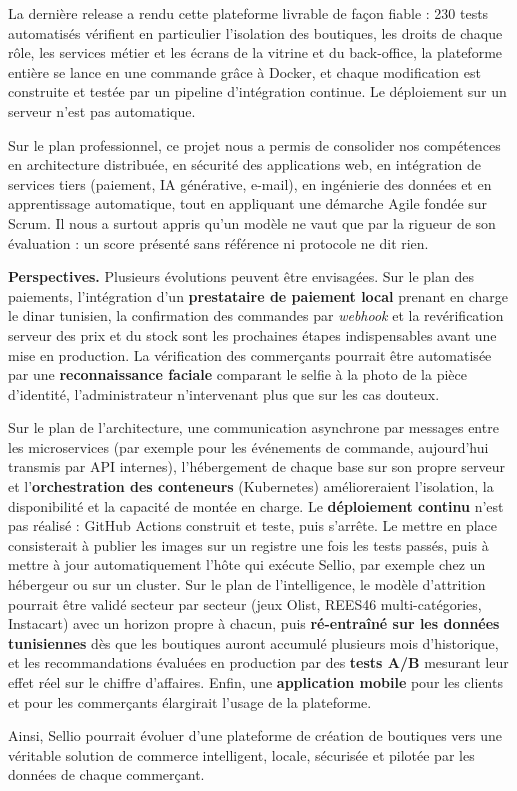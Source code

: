 La dernière release a rendu cette plateforme livrable de façon fiable : 230 tests automatisés vérifient en particulier l'isolation des boutiques, les droits de chaque rôle, les services métier et les écrans de la vitrine et du back-office, la plateforme entière se lance en une commande grâce à Docker, et chaque modification est construite et testée par un pipeline d'intégration continue. Le déploiement sur un serveur n'est pas automatique.\newline

Sur le plan professionnel, ce projet nous a permis de consolider nos compétences en architecture distribuée, en sécurité des applications web, en intégration de services tiers (paiement, IA générative, e-mail), en ingénierie des données et en apprentissage automatique, tout en appliquant une démarche Agile fondée sur Scrum. Il nous a surtout appris qu'un modèle ne vaut que par la rigueur de son évaluation : un score présenté sans référence ni protocole ne dit rien.\newline

\textbf{Perspectives.} Plusieurs évolutions peuvent être envisagées. Sur le plan des paiements, l'intégration d'un \textbf{prestataire de paiement local} prenant en charge le dinar tunisien, la confirmation des commandes par \textit{webhook} et la revérification serveur des prix et du stock sont les prochaines étapes indispensables avant une mise en production. La vérification des commerçants pourrait être automatisée par une \textbf{reconnaissance faciale} comparant le selfie à la photo de la pièce d'identité, l'administrateur n'intervenant plus que sur les cas douteux.

Sur le plan de l'architecture, une communication asynchrone par messages entre les microservices (par exemple pour les événements de commande, aujourd'hui transmis par API internes), l'hébergement de chaque base sur son propre serveur et l'\textbf{orchestration des conteneurs} (Kubernetes) amélioreraient l'isolation, la disponibilité et la capacité de montée en charge. Le \textbf{déploiement continu} n'est pas réalisé : GitHub Actions construit et teste, puis s'arrête. Le mettre en place consisterait à publier les images sur un registre une fois les tests passés, puis à mettre à jour automatiquement l'hôte qui exécute Sellio, par exemple chez un hébergeur ou sur un cluster. Sur le plan de l'intelligence, le modèle d'attrition pourrait être validé secteur par secteur (jeux Olist, REES46 multi-catégories, Instacart) avec un horizon propre à chacun, puis \textbf{ré-entraîné sur les données tunisiennes} dès que les boutiques auront accumulé plusieurs mois d'historique, et les recommandations évaluées en production par des \textbf{tests A/B} mesurant leur effet réel sur le chiffre d'affaires. Enfin, une \textbf{application mobile} pour les clients et pour les commerçants élargirait l'usage de la plateforme.

Ainsi, Sellio pourrait évoluer d'une plateforme de création de boutiques vers une véritable solution de commerce intelligent, locale, sécurisée et pilotée par les données de chaque commerçant.
